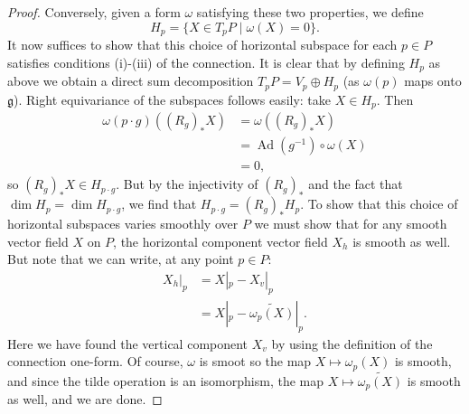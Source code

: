 \documentclass{book}
\newcommand{\fr}{\mathfrak}
\DeclareMathOperator{\Ad}{Ad}
\theoremstyle{plain}
\theoremstyle{definition}
\theoremstyle{remark}
\begin{document}
\begin{proof}
Conversely, given a form $\omega$ satisfying these two properties, we define
\[H_p=\{X\in T_pP\mid \omega(X)=0\}.\]
It now suffices to show that this choice of horizontal subspace for each $p\in P$ satisfies conditions (i)-(iii) of the connection.
It is clear that by defining $H_p$ as above we obtain a direct sum decomposition $T_pP=V_p\oplus H_p$ (as $\omega(p)$ maps onto $\fr g$). Right equivariance of the subspaces follows easily: take $X\in H_p$. Then
\begin{align*}
\omega(p\cdot g)((R_g)_*X)&=\omega((R_g)_*X)\\
&=\Ad(g^{-1})\circ\omega(X)\\
&=0,
\end{align*}
so $(R_g)_*X\in H_{p\cdot g}$. But by the injectivity of $(R_g)_*$ and the fact that $\dim H_p=\dim H_{p\cdot g}$, we find that $H_{p\cdot g}=(R_g)_*H_p$.
To show that this choice of horizontal subspaces varies smoothly over $P$ we must show that for any smooth vector field $X$ on $P$, the horizontal component vector field $X_h$ is smooth as well. But note that we can write, at any point $p\in P$:
\begin{align*}
X_h|_p&=X|_p-X_v|_p\\
&=X|_p-\widetilde{\omega_p(X)}|_p.
\end{align*}
Here we have found the vertical component $X_v$ by using the definition of the connection one-form.
Of course, $\omega$ is smoot so the map $X\mapsto \omega_p(X)$ is smooth, and since the tilde operation is an isomorphism, the map $X\mapsto \widetilde{\omega_p(X)}$ is smooth as well, and we are done.
\end{proof}
\end{document}
